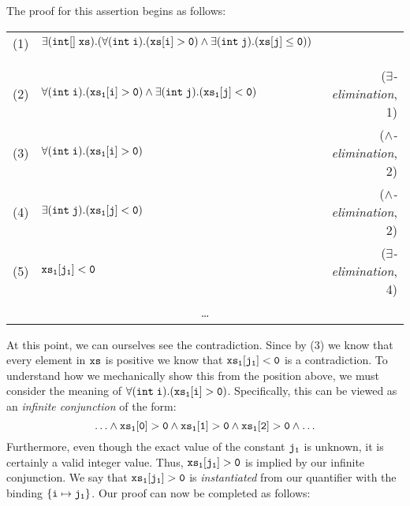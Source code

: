 The proof for this assertion begins as follows:

\begin{tcolorbox}
\begin{tabularx}{\textwidth}{l X r}
(1) & ${\tt \exists(int[]\;xs).(\forall(int\;i).(xs[i] >
  0)\land\exists(int\;j).(xs[j] \le 0))}$&\\
&&\\
\hline
\hline
&&\\
(2) & ${\tt \forall(int\;i).(xs_1[i] > 0)\land\exists(int\;j).(xs_1[j] < 0)}$ & ($\exists${\em-elimination}, 1)\\
(3) & ${\tt \forall(int\;i).(xs_1[i] > 0)}$ & ($\land${\em-elimination}, 2)\\
(4) & ${\tt \exists(int\;j).(xs_1[j] < 0)}$ & ($\land${\em-elimination}, 2)\\
(5) & ${\tt xs_1[j_1] < 0}$ & ($\exists${\em-elimination}, 4)\\
\multicolumn{3}{c}{\ldots}\\
\end{tabularx}
\end{tcolorbox}

At this point, we can ourselves see the contradiction.  Since by (3)
we know that every element in ${\tt xs}$ is positive we know that
${\tt xs_1[j_1] < 0}$ is a contradiction.  To understand how we
mechanically show this from the position above, we must consider the
meaning of ${\tt \forall(int\;i).(xs_1[i] > 0)}$.  Specifically, this
can be viewed as an {\em infinite conjunction} of the form:
\begin{displaymath}
{\tt \ldots\land xs_1[0] > 0\land xs_1[1] > 0\land xs_1[2] > 0\land\ldots}
\end{displaymath}
Furthermore, even though the exact value of the constant ${\tt j_1}$
is unknown, it is certainly a valid integer value.  Thus,
${\tt xs_1[j_1] > 0}$ is implied by our infinite conjunction.  We say
that ${\tt xs_1[j_1] > 0}$ is {\em instantiated} from our quantifier
with the binding ${\tt\{i\mapsto j_1\}}$.  Our proof can now be
completed as follows:

